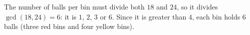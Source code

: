 The number of balls per bin must divide both $18$ and $24$, so it divides $\gcd(18,24)=6$: it is $1$, $2$, $3$ or $6$. Since it is greater than $4$, each bin holds $\boxed{6}$ balls (three red bins and four yellow bins).
